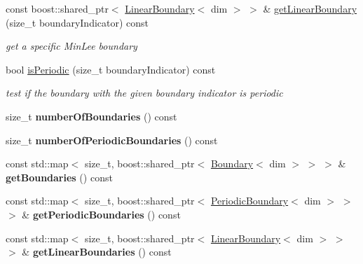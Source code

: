 \begin{DoxyCompactItemize}
const boost::shared\_\-ptr$<$ \hyperlink{classnatrium_1_1LinearBoundary}{LinearBoundary}$<$ dim $>$ $>$ \& \hyperlink{classnatrium_1_1BoundaryCollection_a1f2d415af1d71df84bbbcad218ccc79b}{getLinearBoundary} (size\_\-t boundaryIndicator) const 
\begin{DoxyCompactList}\small\item\em get a specific MinLee boundary \item\end{DoxyCompactList}\item 
\hypertarget{classnatrium_1_1BoundaryCollection_aec4a9de4aaccaa7a49e5308bf9812c66}{
bool \hyperlink{classnatrium_1_1BoundaryCollection_aec4a9de4aaccaa7a49e5308bf9812c66}{isPeriodic} (size\_\-t boundaryIndicator) const }
\label{classnatrium_1_1BoundaryCollection_aec4a9de4aaccaa7a49e5308bf9812c66}

\begin{DoxyCompactList}\small\item\em test if the boundary with the given boundary indicator is periodic \item\end{DoxyCompactList}\item 
\hypertarget{classnatrium_1_1BoundaryCollection_ad9dbba7ffccaa31ee79cace73197148e}{
size\_\-t {\bfseries numberOfBoundaries} () const }
\label{classnatrium_1_1BoundaryCollection_ad9dbba7ffccaa31ee79cace73197148e}

\item 
\hypertarget{classnatrium_1_1BoundaryCollection_a62004be7508761795d894ed7ca7e4eb8}{
size\_\-t {\bfseries numberOfPeriodicBoundaries} () const }
\label{classnatrium_1_1BoundaryCollection_a62004be7508761795d894ed7ca7e4eb8}

\item 
\hypertarget{classnatrium_1_1BoundaryCollection_a3c7a2ed26b19c2650c91e89052f94025}{
const std::map$<$ size\_\-t, boost::shared\_\-ptr$<$ \hyperlink{classnatrium_1_1Boundary}{Boundary}$<$ dim $>$ $>$ $>$ \& {\bfseries getBoundaries} () const }
\label{classnatrium_1_1BoundaryCollection_a3c7a2ed26b19c2650c91e89052f94025}

\item 
\hypertarget{classnatrium_1_1BoundaryCollection_a280f2769a647610ee330205e8038239c}{
const std::map$<$ size\_\-t, boost::shared\_\-ptr$<$ \hyperlink{classnatrium_1_1PeriodicBoundary}{PeriodicBoundary}$<$ dim $>$ $>$ $>$ \& {\bfseries getPeriodicBoundaries} () const }
\label{classnatrium_1_1BoundaryCollection_a280f2769a647610ee330205e8038239c}

\item 
\hypertarget{classnatrium_1_1BoundaryCollection_a56a387bc0d2e1c1550564e4c9b887c58}{
const std::map$<$ size\_\-t, boost::shared\_\-ptr$<$ \hyperlink{classnatrium_1_1LinearBoundary}{LinearBoundary}$<$ dim $>$ $>$ $>$ \& {\bfseries getLinearBoundaries} () const }
\label{classnatrium_1_1BoundaryCollection_a56a387bc0d2e1c1550564e4c9b887c58}

\end{DoxyCompactItemize}



